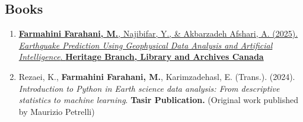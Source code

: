 \documentclass[letterpaper,11pt]{article}
\begin{document}
\begin{justify}
			\subsection*{Books}
			\begin{enumerate}[label=\arabic*.,left=0pt,topsep=7.5pt,partopsep=0pt,itemsep=3.5pt,parsep=0pt]
				\item \href{https://www.amazon.com/dp/106932437X/ref=tmm_pap_swatch_0?_encoding=UTF8&dib_tag=se&dib=eyJ2IjoiMSJ9.fV6NcKzNqVmNMx01e9olJh9RUoGgbt3bwYVVMROKdEU.v8uasEadi-iUYNyBqfXdQtpDWmK8WfYL80Y5MgFWLiI&qid=1748198567&sr=1-2}{\textbf{Farmahini Farahani, M.}, Najibifar, Y., \& Akbarzadeh Afshari, A. (2025). \textit{Earthquake Prediction Using Geophysical Data Analysis and Artificial Intelligence}. \textbf{Heritage Branch, Library and Archives Canada}} 
				\item Rezaei, K., \textbf{Farmahini Farahani, M.}, Karimzadehasl, E. (Trans.). (2024). \textit{Introduction to Python in Earth science data analysis: From descriptive statistics to machine learning}. \textbf{Tasir Publication.} (Original work published by Maurizio Petrelli)
				
			\end{enumerate}
		\end{justify}
		\vspace{-2.4em}
		
\end{document}

